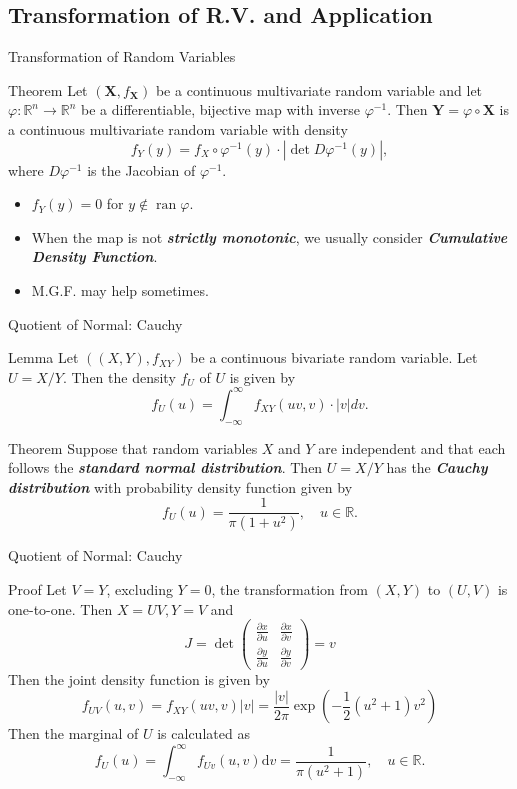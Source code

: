 \documentclass{beamer}
\newcommand{\bb}[1]{\textcolor{antiquefuchsia}{\textbf{\textit{#1}}}}
\begin{document}
\subsection{Transformation of R.V. and Application}
\begin{frame}{Transformation of Random Variables}
\begin{block}{Theorem}
Let $\left(\boldsymbol{X}, f_{\boldsymbol{X}}\right)$ be a continuous multivariate random variable and let $\varphi: \mathbb{R}^{n} \rightarrow \mathbb{R}^{n}$ be a differentiable, bijective map with inverse $\varphi^{-1}$. Then $\boldsymbol{Y}=\varphi \circ \boldsymbol{X}$ is a continuous multivariate random variable with density
$$
f_{Y}(y)=f_{X} \circ \varphi^{-1}(y) \cdot\left|\operatorname{det} D \varphi^{-1}(y)\right|,
$$
where $D \varphi^{-1}$ is the Jacobian of $\varphi^{-1}$.
\end{block}
\begin{itemize}
\item $f_{Y}(y)=0$ for $y \notin \operatorname{ran} \varphi$.
\item When the map is not \bb{strictly monotonic}, we usually consider \bb{Cumulative Density Function}.
\item M.G.F. may help sometimes.
\end{itemize}
\end{frame}

\begin{frame}{Quotient of Normal: Cauchy}
\begin{block}{Lemma}
Let $\left((X, Y), f_{X Y}\right)$ be a continuous bivariate random variable. Let $U=X / Y$. Then the density $f_{U}$ of $U$ is given by
$$
f_{U}(u)=\int_{-\infty}^{\infty} f_{X Y}(u v, v) \cdot|v| d v .
$$
\end{block}
\begin{block}{Theorem}
Suppose that random variables $X$ and $Y$ are independent and that each follows the \bb{standard normal distribution}. Then $U=X / Y$ has the \bb{Cauchy distribution} with probability density function given by
$$
f_{U}(u)=\frac{1}{\pi\left(1+u^{2}\right)}, \quad u \in \mathbb{R} .
$$
\end{block}
\end{frame}

\begin{frame}{Quotient of Normal: Cauchy}
\begin{block}{Proof}
Let $V=Y$, excluding $Y=0$, the transformation from $(X, Y)$ to $(U, V)$ is one-to-one. Then $X=U V, Y=V$ and
$$
J=\operatorname{det}\left(\begin{array}{ll}
\frac{\partial x}{\partial u} & \frac{\partial x}{\partial v} \\
\frac{\partial y}{\partial u} & \frac{\partial y}{\partial v}
\end{array}\right)=v
$$
Then the joint density function is given by
$$
f_{U V}(u, v)=f_{X Y}(u v, v)|v|=\frac{|v|}{2 \pi} \exp \left(-\frac{1}{2}\left(u^{2}+1\right) v^{2}\right)
$$
Then the marginal of $U$ is calculated as
$$
f_{U}(u)=\int_{-\infty}^{\infty} f_{U v}(u, v) \mathrm{d} v=\frac{1}{\pi\left(u^{2}+1\right)}, \quad u \in \mathbb{R} .
$$
\end{block}
\end{frame}
\end{document}
